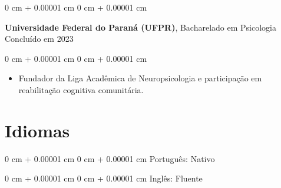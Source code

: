\documentclass[10pt, letterpaper]{article}
\newenvironment{highlights}{
    \begin{itemize}[
        topsep=0.10 cm,
        parsep=0.10 cm,
        partopsep=0pt,
        itemsep=0pt,
        leftmargin=0 cm + 10pt
    ]
}{
    \end{itemize}
}
\newenvironment{onecolentry}{
    \begin{adjustwidth}{
        0 cm + 0.00001 cm
    }{
        0 cm + 0.00001 cm
    }
}{
    \end{adjustwidth}
}
\begin{document}
    \begin{onecolentry}
        \setcolumnwidth{\fill, 4.5cm}
        \begin{paracol}{2}
            \textbf{Universidade Federal do Paraná (UFPR)}, Bacharelado em Psicologia
            \switchcolumn
            \raggedleft Concluído em 2023
        \end{paracol}
    \end{onecolentry}
    \vspace{0.10cm}
    \begin{onecolentry}
        \begin{highlights}
                    \item Fundador da Liga Acadêmica de Neuropsicologia e participação em reabilitação cognitiva comunitária.
        \end{highlights}
    \end{onecolentry}
    
\section{Idiomas}
\begin{onecolentry}Português: Nativo\end{onecolentry}
\vspace{0.2cm}
\begin{onecolentry}Inglês: Fluente\end{onecolentry}
\end{document}
